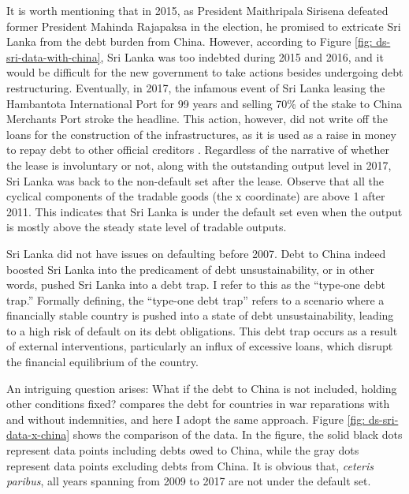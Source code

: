 It is worth mentioning that in 2015, as President Maithripala Sirisena defeated former President Mahinda Rajapaksa in the election, he promised to extricate Sri Lanka from the debt burden from China. However, according to Figure \ref{fig: ds-sri-data-with-china}, Sri Lanka was too indebted during 2015 and 2016, and it would be difficult for the new government to take actions besides undergoing debt restructuring. Eventually, in 2017, the infamous event of Sri Lanka leasing the Hambantota International Port for 99 years and selling 70\% of the stake to China Merchants Port stroke the headline. This action, however, did not write off the loans for the construction of the infrastructures, as it is used as a raise in money to repay debt to other official creditors \citep{Brautigam-meme-2020, Moramudali_2019}. Regardless of the narrative of whether the lease is involuntary or not, along with the outstanding output level in 2017, Sri Lanka was back to the non-default set after the lease.
Observe that all the cyclical components of the tradable goods (the x coordinate) are above 1 after 2011. This indicates that Sri Lanka is under the default set even when the output is mostly above the steady state level of tradable outputs.

Sri Lanka did not have issues on defaulting before 2007. Debt to China indeed boosted Sri Lanka into the predicament of debt unsustainability, or in other words, pushed Sri Lanka into a debt trap. I refer to this as the ``type-one debt trap.'' Formally defining, the ``type-one debt trap'' refers to a scenario where a financially stable country is pushed into a state of debt unsustainability, leading to a high risk of default on its debt obligations. This debt trap occurs as a result of external interventions, particularly an influx of excessive loans, which disrupt the financial equilibrium of the country.

An intriguing question arises: What if the debt to China is not included, holding other conditions fixed? \citet{Hinrichsen_2020-chapter4} compares the debt for countries in war reparations with and without indemnities, and here I adopt the same approach. Figure \ref{fig: ds-sri-data-x-china} shows the comparison of the data. In the figure, the solid black dots represent data points including debts owed to China, while the gray dots represent data points excluding debts from China.
It is obvious that, \emph{ceteris paribus}, all years spanning from 2009 to 2017 are not under the default set.

